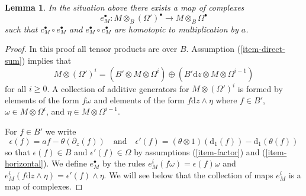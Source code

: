 \documentclass{stacks-project}
\theoremstyle{plain}
\newtheorem{lemma}[subsection]{Lemma}
\theoremstyle{definition}
\theoremstyle{remark}
\numberwithin{equation}{subsection}
\begin{document}
\begin{lemma}
\label{lemma-find-homotopy}
In the situation above there exists a map of complexes
$$
e_M^\bullet :
M \otimes_B (\Omega')^\bullet
\longrightarrow
M \otimes_B \Omega^\bullet
$$
such that $c_M^\bullet \circ e_M^\bullet$
and $e_M^\bullet \circ c_M^\bullet$ are homotopic to
multiplication by $a$.
\end{lemma}

\begin{proof}
In this proof all tensor products are over $B$.
Assumption (\ref{item-direct-sum}) implies that
$$
M \otimes (\Omega')^i =
(B' \otimes M \otimes \Omega^i)
\oplus
(B' \text{d}z \otimes M \otimes \Omega^{i - 1})
$$
for all $i \geq 0$. A collection of additive generators for
$M \otimes (\Omega')^i$ is formed by elements of the form
$f \omega$ and elements of the form $f \text{d}z \wedge \eta$
where $f \in B'$, $\omega \in M \otimes \Omega^i$, and
$\eta \in M \otimes \Omega^{i - 1}$.

\medskip\noindent
For $f \in B'$ we write
$$
\epsilon(f) = af - \theta(\partial_z(f))
\quad\text{and}\quad
\epsilon'(f) = (\theta \otimes 1)(\text{d}_1(f)) - \text{d}_1(\theta(f))
$$
so that $\epsilon(f) \in B$ and $\epsilon'(f) \in \Omega$ by
assumptions (\ref{item-factor}) and (\ref{item-horizontal}).
We define $e_M^\bullet$ by the rules
$e^i_M(f\omega) = \epsilon(f) \omega$ and
$e^i_M(f \text{d}z \wedge \eta) = \epsilon'(f) \wedge \eta$.
We will see below that the collection of maps $e^i_M$ is a map of complexes.


\end{proof}
\end{document}
